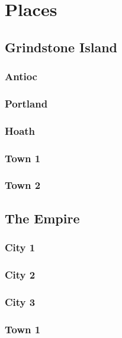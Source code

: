\section{Places}

	\subsection{Grindstone Island}

		\subsubsection{Antioc}

		\subsubsection{Portland}

		\subsubsection{Hoath}
	
		\subsubsection{Town 1}
	
		\subsubsection{Town 2}

	\subsection{The Empire}

		\subsubsection{City 1}

		\subsubsection{City 2}

		\subsubsection{City 3}
	
		\subsubsection{Town 1}
	
